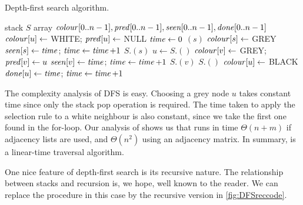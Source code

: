 \begin{algorithm}[H]
  \caption{Depth-first search algorithm.}
    \label{alg:DFScode}
\begin{algorithmic}[1]
	\State stack $S$  
	\State array $\operatorname{\text{\textit{colour}}}[0..n-1], \operatorname{\text{\textit{pred}}}[0..n-1], \operatorname{\text{\textit{seen}}}[0..n-1], \operatorname{\text{\textit{done}}}[0..n-1]$
		\State $\operatorname{\text{\textit{colour}}}[u] \gets $ WHITE; $\operatorname{\text{\textit{pred}}}[u] \gets $ NULL
	\EndFor
	\State $\operatorname{\text{\textit{time}}} \gets 0$
			\State {}$(s)$
		\EndIf
	\EndFor
	\State \Return{$\pred, \seen, \done$}
\EndFunction
{}
	\State $\operatorname{\text{\textit{colour}}}[s] \gets $ GREY
	\State $\operatorname{\text{\textit{seen}}}[s] \gets \operatorname{\text{\textit{time}}}$; $\operatorname{\text{\textit{time}}} \gets \operatorname{\text{\textit{time}}} + 1$
	\State $S$.$(s)$
		\State $u \gets S$.$()$
			\State $\operatorname{\text{\textit{colour}}}[v] \gets $ GREY; $\operatorname{\text{\textit{pred}}}[v] \gets u$
			\State $\operatorname{\text{\textit{seen}}}[v] \gets \operatorname{\text{\textit{time}}}$; $\operatorname{\text{\textit{time}}} \gets \operatorname{\text{\textit{time}}} + 1$
			\State $S$.$(v)$
		\Else
			\State $S$.$()$
			\State $\operatorname{\text{\textit{colour}}}[u] \gets $ BLACK
			\State $\operatorname{\text{\textit{done}}}[u] \gets \operatorname{\text{\textit{time}}}$; $\operatorname{\text{\textit{time}}} \gets \operatorname{\text{\textit{time}}} + 1$
		\EndIf
	\EndWhile
\EndFunction
\end{algorithmic}
\end{algorithm}

The complexity analysis of DFS is easy. Choosing a grey node $u$ takes
constant time since only the stack pop operation is required. The time
taken to apply the selection rule to a white neighbour is also constant,
since we take the first one found in the for-loop. Our analysis of
 shows us that  runs in time $\Theta(n+m)$
if adjacency lists are used, and $\Theta(n^2)$ using an adjacency matrix.
In summary,  is a linear-time traversal algorithm.

One nice feature of depth-first search is its recursive nature.  The
relationship between stacks and recursion is, we hope, well known to the
reader. We can replace the  procedure in this case by
the recursive version in \cref{fig:DFSreccode}.

